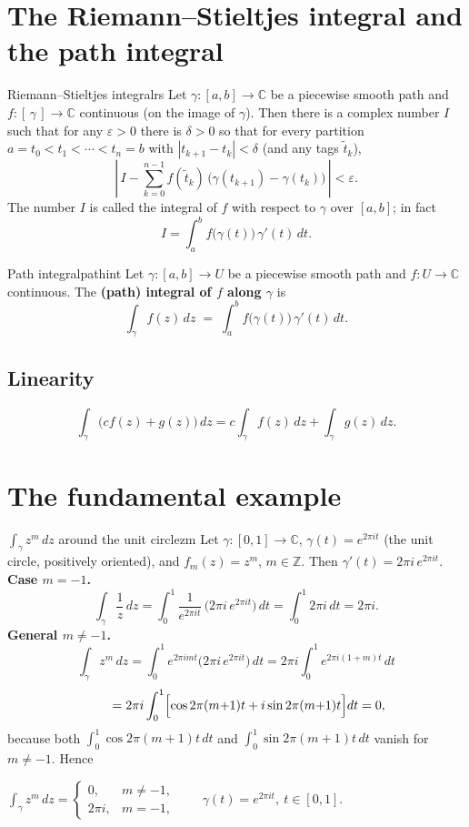 \documentclass[11pt,openany]{report}
\newcommand{\C}{\mathbb{C}}
\newcommand{\Z}{\mathbb{Z}}
\newcommand{\abs}[1]{\left\lvert #1 \right\rvert}
\newcommand{\eps}{\varepsilon}
\begin{document}
\section{The Riemann--Stieltjes integral and the path integral}

\begin{theorem}{Riemann--Stieltjes integral}{rs}
Let $\gamma:[a,b]\to\C$ be a piecewise smooth path and $f:[\,\gamma\,]\to\C$ continuous
(on the image of $\gamma$). Then there is a complex number $I$ such that for any
$\eps>0$ there is $\delta>0$ so that for every partition
$a=t_0<t_1<\cdots<t_n=b$ with $\abs{t_{k+1}-t_k}<\delta$ (and any tags $\tilde t_k$),
\[
  \left\lvert\, I - \sum_{k=0}^{n-1} f(\tilde t_k)\,\bigl(\gamma(t_{k+1})-\gamma(t_k)\bigr)\,\right\rvert < \eps .
\]
The number $I$ is called the integral of $f$ with respect to $\gamma$ over $[a,b]$; in fact
\[
  I = \int_a^b f\bigl(\gamma(t)\bigr)\,\gamma'(t)\,dt .
\]
\end{theorem}

\begin{definition}{Path integral}{pathint}
Let $\gamma:[a,b]\to U$ be a piecewise smooth path and $f:U\to\C$ continuous. The
\textbf{(path) integral of $f$ along $\gamma$} is
\[
  \int_\gamma f(z)\,dz \;=\; \int_a^b f\bigl(\gamma(t)\bigr)\,\gamma'(t)\,dt .
\]
\end{definition}

\subsection{Linearity}

\[
  \int_\gamma \bigl(c f(z)+g(z)\bigr)\,dz = c\int_\gamma f(z)\,dz + \int_\gamma g(z)\,dz .
\]

\section{The fundamental example}

\begin{example}{$\displaystyle\int_\gamma z^m\,dz$ around the unit circle}{zm}
Let $\gamma:[0,1]\to\C$, $\gamma(t)=e^{2\pi i t}$ (the unit circle, positively oriented),
and $f_m(z)=z^m$, $m\in\Z$. Then $\gamma'(t)=2\pi i\,e^{2\pi i t}$.\\[3pt]
\textbf{Case $m=-1$.}
\[
  \int_\gamma \frac1z\,dz
  = \int_0^1 \frac{1}{e^{2\pi i t}}\,\bigl(2\pi i\,e^{2\pi i t}\bigr)\,dt
  = \int_0^1 2\pi i\,dt = 2\pi i .
\]
\textbf{General $m\ne-1$.}
\[
  \int_\gamma z^m\,dz
  = \int_0^1 e^{2\pi i m t}\bigl(2\pi i\,e^{2\pi i t}\bigr)\,dt
  = 2\pi i\int_0^1 e^{2\pi i (1+m) t}\,dt
\]
\[
  \qquad = 2\pi i\int_0^1\Bigl[\cos 2\pi(m{+}1)t + i\sin 2\pi(m{+}1)t\Bigr]dt = 0,
\]
because both $\int_0^1\cos 2\pi(m{+}1)t\,dt$ and $\int_0^1\sin 2\pi(m{+}1)t\,dt$ vanish for
$m\ne-1$. Hence
\begin{keybox}
\centering
$\displaystyle \int_\gamma z^m\,dz =
\begin{cases} 0, & m\ne -1,\\[3pt] 2\pi i, & m=-1, \end{cases}
\qquad \gamma(t)=e^{2\pi i t},\ t\in[0,1].$
\end{keybox}
\end{example}
\end{document}
